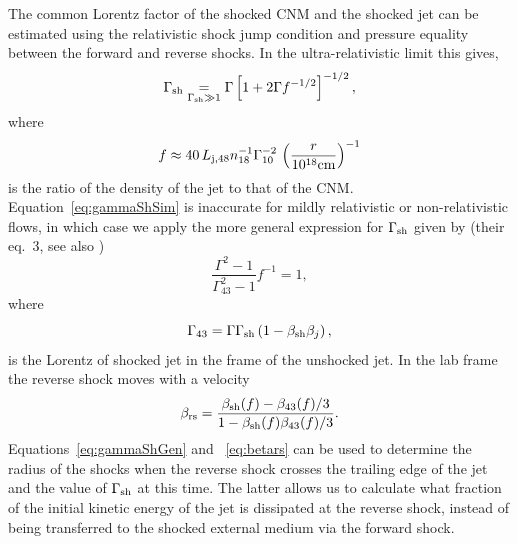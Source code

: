 \documentclass[usenatbib,fleqn]{mnras}
\begin{document}
The common Lorentz factor of the shocked CNM and the shocked jet can
be estimated using the relativistic shock jump condition and pressure
equality between the forward and reverse shocks.  In the
ultra-relativistic limit this gives,
\begin{equation}
\Gamma_{\rm sh} \underset{\Gamma_{\rm sh} \gg 1}= \Gamma\left[1 +
  2\Gamma f^{-1/2}\right]^{-1/2},
\label{eq:gammaShSim}
\end{equation}
where
\begin{equation}
  f\approx 40\,  L_{\rm j,48} n_{18}^{-1} \Gamma_{10}^{-2} \, \left(\frac{r}{10^{18} {\rm
        cm}}\right)^{-1} 
\end{equation}
is the ratio of the density of the jet to that of the
CNM. Equation~\eqref{eq:gammaShSim} is inaccurate for mildly relativistic or
non-relativistic flows, in which case we apply the more general
expression for $\Gamma_{\rm sh}$ given by \citet{Beloborodov&Uhm2006}
(their eq.~3, see also \citealt{Mimica&Aloy2010})
\begin{equation}
\frac{\Gamma^2-1}{\Gamma_{43}^2-1} f^{-1}=1 ,
\end{equation}
where
\begin{equation}
  \Gamma_{43}=\Gamma \Gamma_{\rm sh} \left(1-\beta_{\rm sh} \beta_j\right),
\label{eq:gammaShGen}
\end{equation}
is the Lorentz of shocked jet in the frame of the unshocked jet. In
the lab frame the reverse shock moves with a velocity
\begin{equation}
\beta_{\rm rs}=\frac{\beta_{\rm sh}(f)-\beta_{43}(f)/3}{1-\beta_{\rm
    sh}(f) \beta_{43}(f)/3}.
\label{eq:betars}
\end{equation} 
%
Equations~\eqref{eq:gammaShGen} and ~\eqref{eq:betars} can be used to
determine the radius of the shocks when the reverse shock crosses the
trailing edge of the jet and the value of $\Gamma_{\rm sh}$ at this
time.  The latter allows us to calculate what fraction of the initial
kinetic energy of the jet is dissipated at the reverse shock, instead
of being transferred to the shocked external medium via the forward
shock.



\clearpage
  \footnotesize{
    
    
  }
\end{document}
